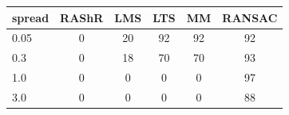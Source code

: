 \begin{tabular}{@{}lccccc@{}}
\toprule
spread & RAShR & LMS & LTS & MM & RANSAC \\
\midrule
0.05 & 0 & 20 & 92 & 92 & 92 \\
0.3 & 0 & 18 & 70 & 70 & 93 \\
1.0 & 0 & 0 & 0 & 0 & 97 \\
3.0 & 0 & 0 & 0 & 0 & 88 \\
\bottomrule
\end{tabular}
